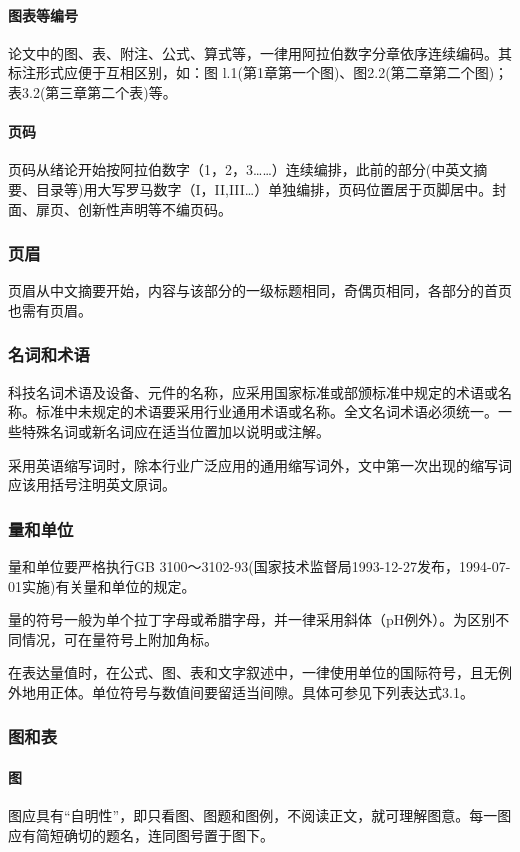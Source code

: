 \paragraph{图表等编号} 
论文中的图、表、附注、公式、算式等，一律用阿拉伯数字分章依序连续编码。其标注形式应便于互相区别，如：图 l.1(第1章第一个图)、图2.2(第二章第二个图)；表3.2(第三章第二个表)等。
\paragraph{页码}
页码从绪论开始按阿拉伯数字（1，2，3……）连续编排，此前的部分(中英文摘要、目录等)用大写罗马数字（I，II,III…）单独编排，页码位置居于页脚居中。封面、扉页、创新性声明等不编页码。
\subsubsection{页眉}
页眉从中文摘要开始，内容与该部分的一级标题相同，奇偶页相同，各部分的首页也需有页眉。
\subsubsection{名词和术语}
科技名词术语及设备、元件的名称，应采用国家标准或部颁标准中规定的术语或名称。标准中未规定的术语要采用行业通用术语或名称。全文名词术语必须统一。一些特殊名词或新名词应在适当位置加以说明或注解。

采用英语缩写词时，除本行业广泛应用的通用缩写词外，文中第一次出现的缩写词应该用括号注明英文原词。
\subsubsection{量和单位}
量和单位要严格执行GB 3100～3102-93(国家技术监督局1993-12-27发布，1994-07-01实施)有关量和单位的规定。

量的符号一般为单个拉丁字母或希腊字母，并一律采用斜体（pH例外）。为区别不同情况，可在量符号上附加角标。 

在表达量值时，在公式、图、表和文字叙述中，一律使用单位的国际符号，且无例外地用正体。单位符号与数值间要留适当间隙。具体可参见下列表达式3.1。

\subsubsection{图和表}
\paragraph{图}
图应具有“自明性”，即只看图、图题和图例，不阅读正文，就可理解图意。每一图应有简短确切的题名，连同图号置于图下。

